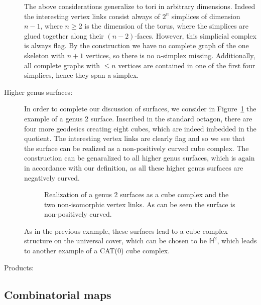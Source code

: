 \begin{bsp}
\begin{description}
    The above considerations generalize to tori in arbitrary dimensions. Indeed the interesting vertex links consist always of \(2^n\) simplices of dimension \(n-1\), where \(n\geq2\) is the dimension of the torus, where the simplices are glued together along their \((n-2)\)-faces. However, this simplicial complex is always flag. By the construction we have no complete graph of the one skeleton with \(n+1\) vertices, so there is no \(n\)-simplex missing. Additionally, all complete graphs with \(\leq n\) vertices are contained in one of the first four simplices, hence they span a simplex.
  \item[Higher genus surfaces:] In order to complete our discussion of surfaces, we consider in Figure~\ref{fig:genus-2} the example of a genus 2 surface. Inscribed in the standard octagon, there are four more geodesics creating eight cubes, which are indeed imbedded in the quotient. The interesting vertex links are clearly flag and so we see that the surface can be realized as a non-positively curved cube complex. The construction can be genaralized to all higher genus surfaces, which is again in accordance with our definition, as all these higher genus surfaces are negatively curved.
    \begin{figure}[htbp]
      \centering
      
      \caption{Realization of a genus 2 surfaces as a cube complex and the two non-isomorphic vertex links. As can be seen the surface is non-positively curved.}
      \label{fig:genus-2}
    \end{figure}

    As in the previous example, these surfaces lead to a cube complex structure on the universal cover, which can be chosen to be \(\mathbb{H}^2\), which leads to another example of a CAT(0) cube complex.
  \item[Products:]
  \end{description}
\end{bsp}

\subsection{Combinatorial maps}
\label{sec:comb-map}

